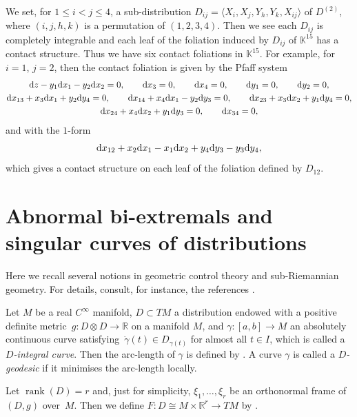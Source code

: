 \documentclass[pdftex]{sigma}
\numberwithin{equation}{section}
\theoremstyle{definition}
\newcommand{\R}{\mathbb{R}}
\newcommand{\KK}{\mathbb{K}}
\newcommand{\0}{\boldsymbol{0}}
\newcommand{\rank}{\operatorname{rank}}
\begin{document}
\begin{Remark}
We set, for $1 \leq i < j \leq 4$, a sub-distribution
$D_{ij} = \langle X_i, X_j, Y_h, Y_k, X_{ij}\rangle$ of $D^{(2)}$, where $(i, j, h, k)$ is a permutation of $(1, 2, 3, 4)$.
Then we see each $D_{ij}$ is completely integrable
and each leaf of the foliation induced by $D_{ij}$ of $\KK^{15}$ has a contact structure.
Thus we have six contact foliations in $\KK^{15}$.
For example, for $i = 1$, $j = 2$, then the contact foliation is given by the Pfaff system
\begin{gather*}
{\rm d}z - y_1{\rm d}x_1 - y_2{\rm d}x_2 = 0,\qquad {\rm d}x_3 = 0,\qquad {\rm d}x_4 = 0,\qquad {\rm d}y_1 = 0,\qquad {\rm d}y_2 = 0,
\\
{\rm d}x_{13} + x_3{\rm d}x_1 + y_2{\rm d}y_4 = 0,\qquad {\rm d}x_{14} + x_4{\rm d}x_1 - y_2{\rm d}y_3 = 0,\qquad
{\rm d}x_{23} + x_3{\rm d}x_2 + y_1{\rm d}y_4 = 0,
\\
{\rm d}x_{24} + x_4{\rm d}x_2 + y_1{\rm d}y_3 = 0,\qquad {\rm d}x_{34} = 0,
\end{gather*}
and with the $1$-form
\[
{\rm d}x_{12} + x_2{\rm d}x_1 - x_1{\rm d}x_2 + y_4{\rm d}y_3 - y_3{\rm d}y_4,
\]
which gives a contact structure on each leaf of the foliation defined by $D_{12}$.
\end{Remark}

\section{Abnormal bi-extremals and singular curves of distributions}
\label{Abnormal-bi-extremals-general}

Here we recall several notions in geometric control theory and sub-Riemannian geometry.
For details, consult, for instance, the references \cite{AS, BC, Montgomery0, Montgomery}.

Let $M$ be a real $C^\infty$ manifold,
$D \subset TM$ a distribution endowed with a positive definite met\-ric~${g\colon D\otimes D \to \R}$
on a manifold $M$, and $\gamma\colon [a, b] \to M$ an absolutely continuous curve sat\-is\-fy\-ing~$\dot{\gamma}(t) \in D_{\gamma(t)}$
for almost all $t \in I$, which is called a {\it $D$-integral curve}.
Then the arc-length of $\gamma$ is defined by
.
A curve $\gamma$ is called a {\it $D$-geodesic} if it minimises the arc-length locally.

Let $\rank(D) = r$ and, just for simplicity, $\xi_1, \dots, \xi_r$ be an orthonormal frame of $(D, g)$ over~$M$.
Then we define $F\colon D \cong M\times \R^r \to TM$ by .
\end{document}
